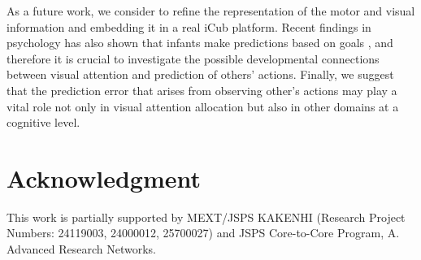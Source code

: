 \documentclass[conference]{IEEEtran}
\begin{document}
As a future work, we consider to refine the representation of the motor and visual information and embedding it in a real iCub platform. Recent findings in psychology has also shown that infants make predictions based on goals \cite{cannon2012infants}, and therefore it is crucial to investigate the possible developmental connections between visual attention and prediction of others' actions. Finally, we suggest that the prediction error that arises from observing other's actions may play a vital role not only in visual attention allocation but also in other domains at a cognitive level.


\section*{Acknowledgment}
This work is partially supported by MEXT/JSPS KAKENHI (Research Project Numbers: 24119003, 24000012, 25700027) and JSPS Core-to-Core Program, A. Advanced Research Networks.



\baselineskip 3.95mm

%
%

\end{document}
